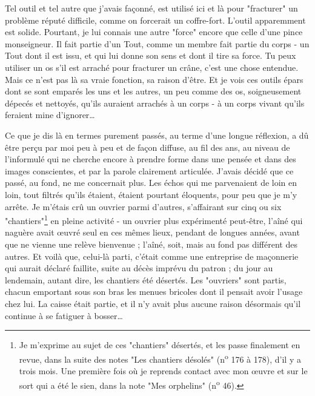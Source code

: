 Tel outil et tel autre que j'avais façonné, est utilisé ici et là pour "fracturer" un problème réputé difficile, comme on forcerait un coffre-fort. L'outil apparemment est solide. Pourtant, je lui connais une autre "force" encore que celle d'une pince monseigneur. Il fait partie d'un Tout, comme un membre fait partie du corps - un Tout dont il est issu, et qui lui donne son sens et dont il tire sa force. Tu peux utiliser un os s'il est arraché pour fracturer un crâne, c'est une chose entendue. Mais ce n'est pas là sa vraie fonction, sa raison d'être. Et je vois ces outils épars dont se sont emparés les uns et les autres, un peu comme des os, soigneusement dépecés et nettoyés, qu'ils auraient arrachés à un corps - à un corps vivant qu'ils feraient mine d'ignorer\ldots

Ce que je dis là en termes purement passés, au terme d'une longue réflexion, a dû être perçu par moi peu à peu et de façon diffuse, au fil des ans, au niveau de l'informulé qui ne cherche encore à prendre forme dans une pensée et dans des images conscientes, et par la parole clairement articulée. J'avais décidé que ce passé, au fond, ne me concernait plus. Les échos qui me parvenaient de loin en loin, tout filtrés qu'ils étaient, étaient pourtant éloquents, pour peu que je m'y arrête. Je m'étais crû un ouvrier parmi d'autres, s'affairant sur cinq ou six "chantiers"\footnote{Je m'exprime au sujet de ces "chantiers" désertés, et les passe finalement en revue, dans la suite des notes "Les chantiers désolés" (n\textsuperscript{o} 176 à 178), d'il y a trois mois. Une première fois où je reprends contact avec mon œuvre et sur le sort qui a été le sien, dans la note "Mes orphelins" (n\textsuperscript{o} 46).} en pleine activité - un ouvrier plus expérimenté peut-être, l'aîné qui naguère avait œuvré seul en ces mêmes lieux, pendant de longues années, avant que ne vienne une relève bienvenue ; l'aîné, soit, mais au fond pas différent des autres. Et voilà que, celui-là parti, c'était comme une entreprise de maçonnerie qui aurait déclaré faillite, suite au décès imprévu du patron ; du jour au lendemain, autant dire, les chantiers été désertés. Les "ouvriers" sont partis, chacun emportant sous son bras les menues bricoles dont il pensait avoir l'usage chez lui. La caisse était partie, et il n'y avait plus aucune raison désormais qu'il continue à se fatiguer à bosser\ldots

